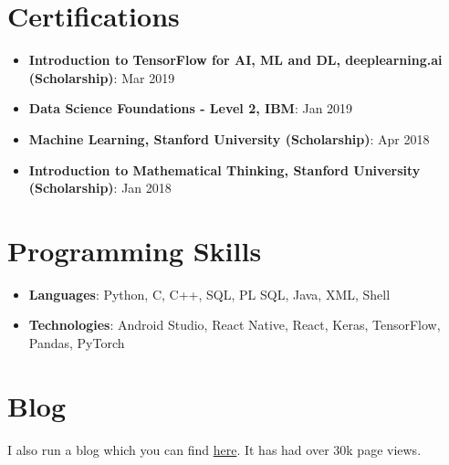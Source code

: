 \documentclass[letterpaper,11pt]{article}
\newcommand{\resumeItem}[2]{
  \item\small{
    \textbf{#1}{: #2 \vspace{-2pt}}
  }
}
\newcommand{\resumeSubItem}[2]{\resumeItem{#1}{#2}\vspace{-4pt}}
\newcommand{\resumeSubHeadingListStart}{\begin{itemize}[leftmargin=*]}
\newcommand{\resumeSubHeadingListEnd}{\end{itemize}}
\begin{document}
\section{Certifications}
  \resumeSubHeadingListStart
      \resumeSubItem
  {Introduction to TensorFlow for AI, ML and DL, deeplearning.ai (Scholarship)}{Mar 2019}
    \resumeSubItem
      {Data Science Foundations - Level 2, IBM}{Jan 2019}
    \resumeSubItem
  {Machine Learning, Stanford University (Scholarship)}{Apr 2018}
    \resumeSubItem
  {Introduction to Mathematical Thinking, Stanford University (Scholarship)}{Jan 2018} 	
\resumeSubHeadingListEnd

\section{Programming Skills}
  \resumeSubHeadingListStart
   \item{
     \textbf{Languages}{: Python, C, C++, SQL, PL SQL, Java, XML, Shell}
      }
      \item{
       \textbf{Technologies}{: Android Studio, React Native, React, Keras, TensorFlow, Pandas, PyTorch}
    }
  \resumeSubHeadingListEnd

\section{Blog}
I also run a blog which you can find  \href{https://rohitmidha23.github.io/blog}{here}. It has had over 30k page views.
\end{document}
